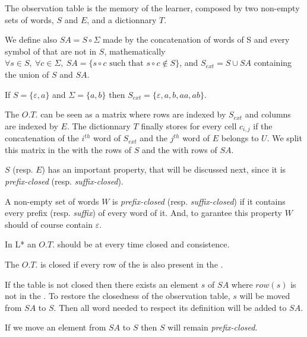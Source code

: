 \begin{definition}
  The observation table is the memory of the learner, composed by two non-empty sets of words, $S$ and $E$, and a dictionnary $T$.
\end{definition}

We define also $SA = S \circ \Sigma$ made by the concatenation of words of S and every symbol of \alphabet{} that are not in $S$, mathematically $\forall s \in S, \: \forall c \in \Sigma, \: SA = \{s \circ c \text{ such that } s \circ c \notin S \} $, and $S_{ext} = S \cup SA$ containing the union of $S$ and $SA$.
\begin{exmp}
  If $S = \{\varepsilon, a\}$ and $\Sigma = \{a, b\}$ then $S_{ext} = \{\varepsilon, a, b, aa, ab\}$.
\end{exmp}

The $O.T.$ can be seen as a matrix where rows are indexed by $S_{ext}$ and columns are indexed by $E$. The dictionnary $T$ finally stores for every cell $c_{i,j}$ if the concatenation of the $i^{th}$ word of $S_{ext}$ and the $j^{th}$ word of $E$ belongs to $U$. We split this matrix in the \upperPart{} with the rows of $S$ and the \lowerPart{} with rows of $SA$.


$S$ (resp. $E$) has an important property, that will be discussed next, since it is \textit{prefix-closed} (resp. \textit{suffix-closed}).

\begin{definition}
  A non-empty set of words $W$ is \textit{prefix-closed} (resp. \textit{suffix-closed}) if it contains every prefix (resp. \textit{suffix}) of every word of it. And, to garantee this property $W$ should of course contain $\varepsilon$.
\end{definition}

In L* an $O.T.$ should be at every time closed and consistence.

\begin{definition}[Closedness]
  The $O.T.$ is closed if every row of the \lowerPart{} is also present in the \upperPart{}.
\end{definition}

If the table is not closed then there exists an element $s$ of $SA$ where $row(s)$ is not in the \upperPart{}. To restore the closedness of the observation table, $s$ will be moved from $SA$ to $S$. Then all word needed to respect its definition will be added to $SA$.

\begin{lemma}
  If we move an element from $SA$ to $S$ then $S$ will remain \textit{prefix-closed}.
\end{lemma}

